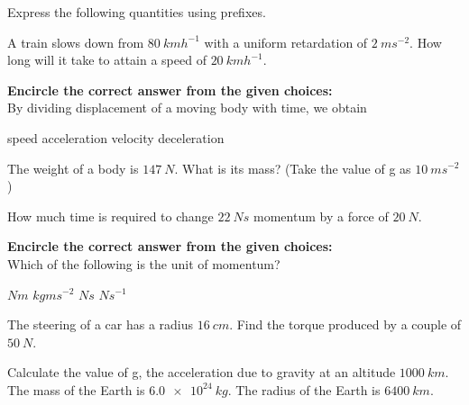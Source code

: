 \documentclass[14pt]{exam}
\begin{document}
\begin{questions}

\question[2] Express the following quantities using prefixes.
\noaddpoints %
\addpoints

\question[20] A train slows down from $80 \  kmh^{-1}$ with a uniform retardation of $2 \ ms^{-2}$. How long will it take to attain a speed of $20 \ kmh^{-1}$.
\addpoints

\question[3] \textbf{Encircle the correct answer from the given choices:} \\
By dividing displacement of a moving body with time, we obtain
\addpoints
\begin{checkboxes}
\choice speed
\choice acceleration
\choice velocity
\choice deceleration
\end{checkboxes}

\question[10] The weight of a body is $147 \ N$. What is its mass? (Take the value of g as $10 \ ms^{-2}$)
\addpoints

\question[10] How much time is required to change $22 \ Ns$ momentum by a force of $20 \ N$.
\addpoints

\question[3] \textbf{Encircle the correct answer from the given choices:} \\
Which of the following is the unit of momentum?
\addpoints
\begin{checkboxes}
\choice $Nm$
\choice $kgms^{-2}$
\choice $Ns$
\choice $Ns^{-1}$
\end{checkboxes}

\question[10] The steering of a car has a radius $16 \ cm$. Find the torque produced by a couple of $50 \ N$.
\addpoints

\question[20] Calculate the value of g, the acceleration due to gravity at an altitude $1000 \ km$. The mass of the Earth is $\num{6.0e24} \ kg$. The radius of the Earth is $6400 \ km$.
\addpoints


\end{questions}
\end{document}
